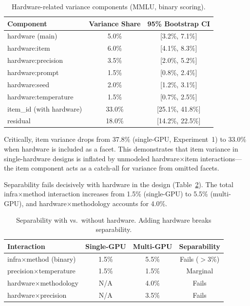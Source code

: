 \documentclass[11pt]{article}
\begin{document}
\begin{table}[t]
\centering
\caption{Hardware-related variance components (MMLU, binary scoring).}
\label{tab:hardware}
\begin{tabular}{lcc}
\toprule
Component & Variance Share & 95\% Bootstrap CI \\
\midrule
hardware (main)       & 5.0\% & [3.2\%, 7.1\%] \\
hardware:item         & 6.0\% & [4.1\%, 8.3\%] \\
hardware:precision    & 3.5\% & [2.0\%, 5.2\%] \\
hardware:prompt       & 1.5\% & [0.8\%, 2.4\%] \\
hardware:seed         & 2.0\% & [1.2\%, 3.1\%] \\
hardware:temperature  & 1.5\% & [0.7\%, 2.5\%] \\
item\_id (with hardware) & 33.0\% & [25.1\%, 41.8\%] \\
residual              & 18.0\% & [14.2\%, 22.5\%] \\
\bottomrule
\end{tabular}
\end{table}

Critically, item variance drops from 37.8\% (single-GPU, Experiment~1) to 33.0\% when hardware is included as a facet.
This demonstrates that item variance in single-hardware designs is inflated by unmodeled hardware$\times$item interactions---the item component acts as a catch-all for variance from omitted facets.

Separability fails decisively with hardware in the design (Table~\ref{tab:sep_hardware}).
The total infra$\times$method interaction increases from 1.5\% (single-GPU) to 5.5\% (multi-GPU), and hardware$\times$methodology accounts for 4.0\%.

\begin{table}[t]
\centering
\caption{Separability with vs.\ without hardware. Adding hardware breaks separability.}
\label{tab:sep_hardware}
\begin{tabular}{lccc}
\toprule
Interaction & Single-GPU & Multi-GPU & Separability \\
\midrule
infra$\times$method (binary) & 1.5\% & 5.5\% & Fails ($>$3\%) \\
precision$\times$temperature & 1.5\% & 1.5\% & Marginal \\
hardware$\times$methodology  & N/A   & 4.0\% & Fails \\
hardware$\times$precision    & N/A   & 3.5\% & Fails \\
\bottomrule
\end{tabular}
\end{table}
\end{document}

